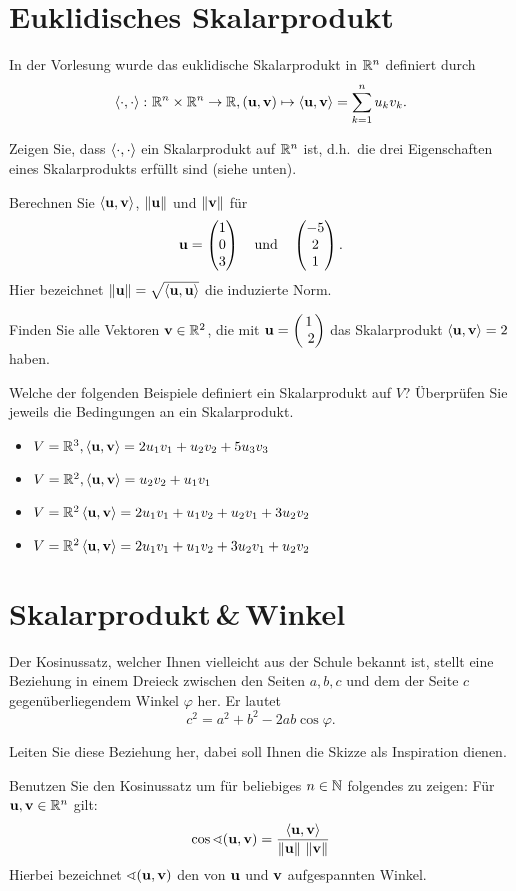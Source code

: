 \documentclass{scrartcl}
\newcommand{\uu}{\mat u}
\newcommand{\vv}{\mat v}
\begin{document}
\section{Euklidisches Skalarprodukt}
In der Vorlesung wurde das euklidische Skalarprodukt in $\RR^n$ definiert durch
\[
  \sp{\cdot}{\cdot} \colon \RR^n \times \RR^n \to \RR, (\uu, \vv) \mapsto \sp{\uu}{\vv} = \sum_{k=1}^n u_k v_k.
\]
\begin{subex}
  \item Zeigen Sie, dass $\sp{\cdot}{\cdot}$ ein Skalarprodukt auf $\RR^n$ ist, d.h.\ die drei Eigenschaften eines Skalarprodukts erfüllt sind (siehe unten).
  \item Berechnen Sie $\sp{\uu}{\vv}$, $\norm{\uu}$ und $\norm{\vv}$ für 
  \[
    \uu = \colvec{1 \\ 0 \\ 3} \quad\mbox{und}\quad \colvec{-5 \\ 2 \\ 1}.
  \]
  Hier bezeichnet $\norm{\uu} = \sqrt{\sp{\uu}{\uu}}$ die induzierte Norm.
  \item Finden Sie alle Vektoren $\vv \in \RR^2$, die mit $\uu = \colvec{1 \\ 2}$ das Skalarprodukt $\sp{\uu}{\vv} = 2$ haben.  
  \item Welche der folgenden Beispiele definiert ein Skalarprodukt auf $V$?
  Überprüfen Sie jeweils die Bedingungen an ein Skalarprodukt.
  \begin{itemize}
    \item $V = \RR^3, \sp{\uu}{\vv} = 2u_1 v_1 +u_2 v_2 +5u_3 v_3$
    \item $V = \RR^2, \sp{\uu}{\vv} = u_2 v_2 + u_1 v_1$
    \item $V =\RR^2 \sp{\uu}{\vv} = 2u_1 v_1 + u_1 v_2 + u_2 v_1 + 3u_2 v_2$
    \item $V =\RR^2 \sp{\uu}{\vv} = 2u_1 v_1 + u_1 v_2 + 3u_2 v_1 + u_2 v_2$
  \end{itemize}
\end{subex}


\section{Skalarprodukt\,\&\,Winkel}
Der Kosinussatz, welcher Ihnen vielleicht aus der Schule bekannt ist, stellt eine Beziehung in einem Dreieck zwischen den Seiten $a,b,c$ und dem der Seite $c$ gegenüberliegendem Winkel $\varphi$ her.
Er lautet
  \[
  c^2=a^2+b^2-2ab\cos \varphi.
  \]
\begin{subex}
  \item Leiten Sie diese Beziehung her, dabei soll Ihnen die Skizze als Inspiration dienen.
  \item Benutzen Sie den Kosinussatz um für beliebiges $n \in \NN$ folgendes zu zeigen: Für $\uu, \vv \in \RR^n$ gilt:
  \[
    \cos \sphericalangle(\uu,\vv) = \frac{\sp{\uu}{\vv}}{\norm{\uu}\,\norm{\vv}}
  \] 
  Hierbei bezeichnet $\sphericalangle(\uu,\vv)$ den von $\uu$ und $\vv$ aufgespannten Winkel.
\end{subex}
\end{document}
